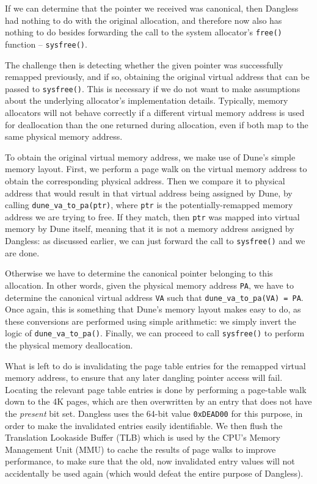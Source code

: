 If we can determine that the pointer we received was canonical, then Dangless had nothing to do with the original allocation, and therefore now also has nothing to do besides forwarding the call to the system allocator's \lstinline!free()! function -- \lstinline!sysfree()!.

The challenge then is detecting whether the given pointer was successfully remapped previously, and if so, obtaining the original virtual address that can be passed to \lstinline!sysfree()!.
This is necessary if we do not want to make assumptions about the underlying allocator's implementation details. Typically, memory allocators will not behave correctly if a different virtual memory address is used for deallocation than the one returned during allocation, even if both map to the same physical memory address.

To obtain the original virtual memory address, we make use of Dune's simple memory layout. First, we perform a page walk on the virtual memory address to obtain the corresponding physical address. Then we compare it to physical address that would result in that virtual address being assigned by Dune, by calling \lstinline!dune_va_to_pa(ptr)!, where \lstinline!ptr! is the potentially-remapped memory address we are trying to free.
If they match, then \lstinline!ptr! was mapped into virtual memory by Dune itself, meaning that it is not a memory address assigned by Dangless: as discussed earlier, we can just forward the call to \lstinline!sysfree()! and we are done.

Otherwise we have to determine the canonical pointer belonging to this allocation. In other words, given the physical memory address \lstinline!PA!, we have to determine the canonical virtual address \lstinline!VA! such that \lstinline!dune_va_to_pa(VA) = PA!. Once again, this is something that Dune's memory layout makes easy to do, as these conversions are performed using simple arithmetic: we simply invert the logic of \lstinline!dune_va_to_pa()!. Finally, we can proceed to call \lstinline!sysfree()! to perform the physical memory deallocation.

What is left to do is invalidating the page table entries for the remapped virtual memory address, to ensure that any later dangling pointer access will fail. Locating the relevant page table entries is done by performing a page-table walk down to the 4K pages, which are then overwritten by an entry that does not have the \emph{present} bit set. Dangless uses the 64-bit value \lstinline!0xDEAD00! for this purpose, in order to make the invalidated entries easily identifiable. We then flush the Translation Lookaside Buffer (TLB) which is used by the CPU's Memory Management Unit (MMU) to cache the results of page walks to improve performance, to make sure that the old, now invalidated entry values will not accidentally be used again (which would defeat the entire purpose of Dangless).

